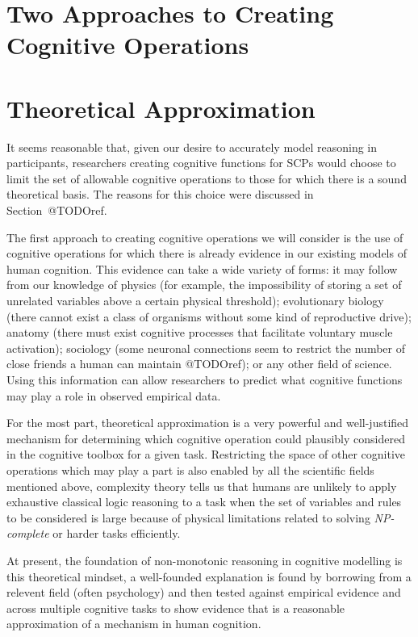 \documentclass[
11pt, %
english, %
singlespacing, %
headsepline, %
]{MastersDoctoralThesis} %
\begin{document}
\section{Two Approaches to Creating Cognitive Operations}
\section{Theoretical Approximation}
It seems reasonable that, given our desire to accurately model reasoning in participants, researchers creating cognitive functions for SCPs would choose to limit the set of allowable cognitive operations to those for which there is a sound theoretical basis. The reasons for this choice were discussed in Section~@TODOref.

The first approach to creating cognitive operations we will consider is the use of cognitive operations for which there is already evidence in our existing models of human cognition. This evidence can take a wide variety of forms: it may follow from our knowledge of physics (for example, the impossibility of storing a set of unrelated variables above a certain physical threshold); evolutionary biology (there cannot exist a class of organisms without some kind of reproductive drive); anatomy (there must exist cognitive processes that facilitate voluntary muscle activation); sociology (some neuronal connections seem to restrict the number of close friends a human can maintain @TODOref); or any other field of science. Using this information can allow researchers to predict what cognitive functions may play a role in observed empirical data. 

For the most part, theoretical approximation is a very powerful and well-justified mechanism for determining which cognitive operation could plausibly considered in the cognitive toolbox for a given task. Restricting the space of other cognitive operations which may play a part is also enabled by all the scientific fields mentioned above, complexity theory tells us that humans are unlikely to apply exhaustive classical logic reasoning to a task when the set of variables and rules to be considered is large because of physical limitations related to solving \textit{NP-complete} or harder tasks efficiently.

At present, the foundation of non-monotonic reasoning in cognitive modelling is this theoretical mindset, a well-founded explanation is found by borrowing from a relevent field (often psychology) and then tested against empirical evidence and across multiple cognitive tasks to show evidence that is a reasonable approximation of a mechanism in human cognition.
\end{document}
